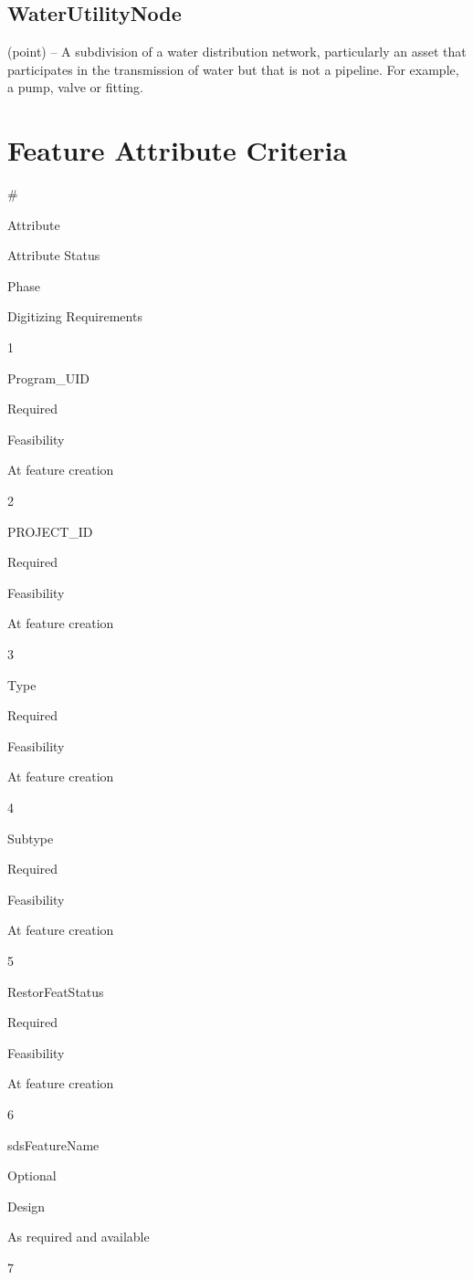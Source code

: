 \documentclass[
  letterpaper,
  DIV=11,
  numbers=noendperiod]{scrreprt}
\begin{document}
\subsection{WaterUtilityNode}\label{waterutilitynode}

(point) -- A subdivision of a water distribution network, particularly
an asset that participates in the transmission of water but that is not
a pipeline. For example, a pump, valve or fitting.

\section{Feature Attribute
Criteria}\label{feature-attribute-criteria-25}

\#

Attribute

Attribute Status

Phase

Digitizing Requirements

1

Program\_UID

Required

Feasibility

At feature creation

2

PROJECT\_ID

Required

Feasibility

At feature creation

3

Type

Required

Feasibility

At feature creation

4

Subtype

Required

Feasibility

At feature creation

5

RestorFeatStatus

Required

Feasibility

At feature creation

6

sdsFeatureName

Optional

Design

As required and available

7
\end{document}
